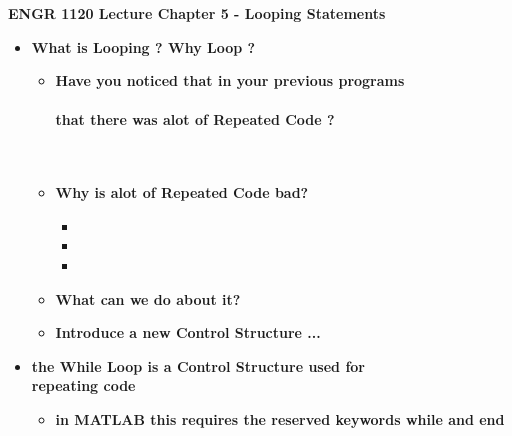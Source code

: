 \documentclass[11pt]{article}
\newcommand{\NUM}{5 }
\begin{document}
\textbf{ \LARGE ENGR 1120 Lecture Chapter \NUM - Looping Statements } \\
	

\Large
\begin{itemize}


	
	\item \textbf{ \LARGE What is \color{mypurple}Looping \color{black}? Why \color{mypurple}Loop\color{black} ?}\\
	
	\begin{itemize}
	\item \textbf{ \LARGE Have you noticed that in your previous programs\\\\ that there was alot of  \color{mypurple}Repeated Code \color{black}? }\\\\\\
	
	\item \textbf{ \LARGE Why is alot of \color{mypurple}Repeated Code \color{black} bad? }\\
	\begin{itemize}
	\item \vspace{10mm}
	\item \vspace{10mm}
	\item \vspace{10mm}
	\end{itemize}
	
	\vspace{10mm}
			\item \textbf{ \LARGE What can we do about it?  }\vspace{30mm}\\
            			
            		\item \textbf{ \LARGE Introduce a new \color{blue}Control Structure \color{black} ... }\vspace{30mm}\\
		\end{itemize}
\newpage

	\item \textbf{ \LARGE the \color{mypurple}While Loop \color{black}is a \color{blue}Control Structure \color{black} used for\\ repeating code}\\
\begin{itemize}
	\item \textbf{ \Large in MATLAB this requires the \color{mypurple} reserved keywords \color{black} \color{blue}while  \color{black} and \color{blue}end \color{black}}\vspace{5mm} \\
	

\end{itemize}
\end{itemize}
\end{document}
